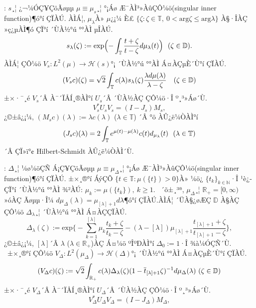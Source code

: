 \documentclass[12pt,a4paper,2sided]{article}
\begin{document}
\newpage {}

\vspace{0.8cm}

 : $s$¸¦ ¿¬¼ÓÇ¥ÇöÃøµµ  $\mu\equiv
\mu_{s}\label{mus}$¸¦ °¡Áø Æ¯ÀÌ³»ÀûÇÔ¼ö(singular inner function)¶ó°í
ÇÏÀÚ. ÀÌÁ¦, $\mu_{\lambda}$À» $\mu$¿¡¼­ È£ $\{\zeta: \zeta \in
\mathbb T, \ 0< \text{arg}\zeta \leq \text{arg}\lambda\}$ À§·ÎÀÇ
»ç¿µÀÌ¶ó ÇÏ°í ´ÙÀ½°ú °°ÀÌ µÎÀÚ.
$$
s_{\lambda}(\zeta)\label{slambdazeta}:=\text{exp}\Bigl(-\int_{\mathbb
T}\frac{t+\zeta}{t-\zeta}d\mu_{\lambda}(t) \Bigr) \ \ \hbox{($\zeta
\in \mathbb D$)}.
$$
ÀÌÁ¦ ÇÔ¼ö $V_s\label{Vs}: L^2(\mu)\to \mathcal H (s)$°¡ ´ÙÀ½°ú °°ÀÌ Á¤ÀÇµÈ´Ù°í ÇÏÀÚ.
\begin{equation}\label{3.4}
(V_s c)(\zeta)=\sqrt{2}\int_{\mathbb
T}c(\lambda)s_{\lambda}(\zeta)\frac{\lambda
d\mu(\lambda)}{\lambda-\zeta}\quad\hbox{($\zeta \in \mathbb D$)}
\end{equation}
±×·¯¸é $V_s$´Â À¯´ÏÅÍ¸®ÀÌ°í $U_s$´Â ´ÙÀ½ÀÇ ÇÔ¼ö·Î º¸³»Áø´Ù.
\begin{equation}\label{3.5}
V_s^*U_s V_s=(I-J_s)M_s,
\end{equation}
¿©±â¿¡¼­, $(M_s c)(\lambda):=\lambda c(\lambda)$ ($\lambda\in\mathbb
T$) ´Â °ö ÀÛ¿ë¼ÒÀÌ°í
$$
(J_s\label{Js} c)(\lambda)=2 \int _{\mathbb T} e^{\mu(t)-\mu(\lambda)}
c(t)d_{\mu_{\lambda}}(t)\ \ \hbox{($\lambda \in \mathbb T$)}
$$
´Â ÇÏ»ï°¢ Hilbert-Schmidt ÀÛ¿ë¼ÒÀÌ´Ù. \

\vspace{.3 cm}

 : $\Delta$¸¦ ¼ø¼öÇÑ Á¡Ç¥ÇöÃøµµ $\mu\equiv
\mu_{\Delta}\label{mudelta}$¸¦ °¡Áø Æ¯ÀÌ³»ÀûÇÔ¼ö(singular inner
function)¶ó°í ÇÏÀÚ. ±×¸®°í ÁýÇÕ $\{t\in \mathbb T: \mu(\{t\})>0
\}$À» ¼ö¿­ $\{t_k\}_{k \in \mathbb N}$·Î ¹è¿­ÇÏ°í ´ÙÀ½°ú  °°ÀÌ ¾²ÀÚ:
$\mu_k:=\mu(\{t_k\}), \ k \geq 1$. \  ´õ±¸³ª, $\mu_{\Delta}$¸¦
$\mathbb R_{+}=[0, \infty)$ »óÀÇ Ãøµµ·Î¼­
$d\mu_{\Delta}(\lambda)=\mu_{[\lambda]+1}d \lambda$¶ó°í ÇÏÀÚ.ÀÌÁ¦
´ÜÀ§¿øÆÇ $\mathbb D$ À§ÀÇ ÇÔ¼ö
$\Delta_{\lambda}\label{deltalambda}$¸¦ ´ÙÀ½°ú °°ÀÌ Á¤ÀÇÇÏÀÚ.
$$
\Delta_{\lambda}(\zeta):=\text{exp}\Biggl\{-\sum_{k=1}^{[\lambda]}\mu_k
\frac{t_k+\zeta}{t_k-\zeta}-(\lambda-[\lambda])\mu_{[\lambda]+1}
\frac{t_{[\lambda]+1}+\zeta}{t_{[\lambda]+1}-\zeta}\Biggr \},
$$
¿©±â¿¡¼­, $[\lambda]$´Â $\lambda$ ($\lambda \in \mathbb R_{+}$)ÀÇ
Á¤¼ö ºÎºÐÀÌ°í $\Delta_0:=1$·Î ¾à¼ÓÇÑ´Ù. \ ±×¸®°í ÇÔ¼ö
$V_{\Delta}\label{Vdelta}: L^2(\mu_{\Delta})\to \mathcal H
(\Delta)$°¡ ´ÙÀ½°ú °°ÀÌ Á¤ÀÇµÈ´Ù°í ÇÏÀÚ.
\begin{equation}\label{3.6}
(V_{\Delta}c)(\zeta):=\sqrt{2} \int_{\mathbb
R_{+}}c(\lambda)\Delta_{\lambda}(\zeta)(1-\overline{t}_{[\lambda]+1}
\zeta)^{-1}d\mu_{\Delta}(\lambda) \ \hbox{($\zeta \in \mathbb D$)}
\end{equation}
±×·¯¸é $V_{\Delta}$´Â À¯´ÏÅÍ¸®ÀÌ°í $U_\Delta$´Â ´ÙÀ½ÀÇ ÇÔ¼ö·Î º¸³»Áø´Ù.
\begin{equation}\label{3.7}
V_{\Delta}^*U_\Delta V_{\Delta}=(I-J_{\Delta})M_{\Delta},
\end{equation}
\end{document}
